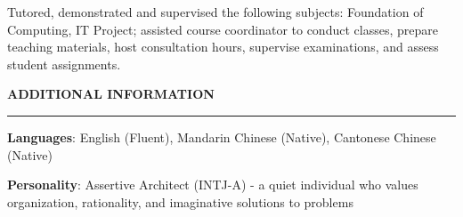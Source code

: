 \documentclass{cv}
\begin{document}
\begin{list}{}{\setlength{\leftmargin}{0pt}}
    \begin{list}{\raisebox{2.0pt}{\tiny$\bullet$}\space}{\setlength{\leftmargin}{11.2pt}}
        \itemsep -4.0pt \vspace{-4.0pt}
        \item Tutored, demonstrated and supervised the following subjects: Foundation of Computing, IT Project; assisted course coordinator to conduct classes, prepare teaching materials, host consultation hours, supervise examinations, and assess student assignments.
    \end{list}
\end{list}


\sectionskip


\textbf{\uppercase{Additional Information}}
\sectionlineskip
\hrule height 0.6pt
\begin{list}{}{\setlength{\leftmargin}{0pt}}
\itemsep -3.0pt
\item
    \textbf{Languages}: English (Fluent), Mandarin Chinese (Native), Cantonese Chinese (Native)
\item
    \textbf{Personality}: Assertive Architect (INTJ-A) - a quiet individual who values organization, rationality, and imaginative solutions to problems
\end{list}

\end{document}
